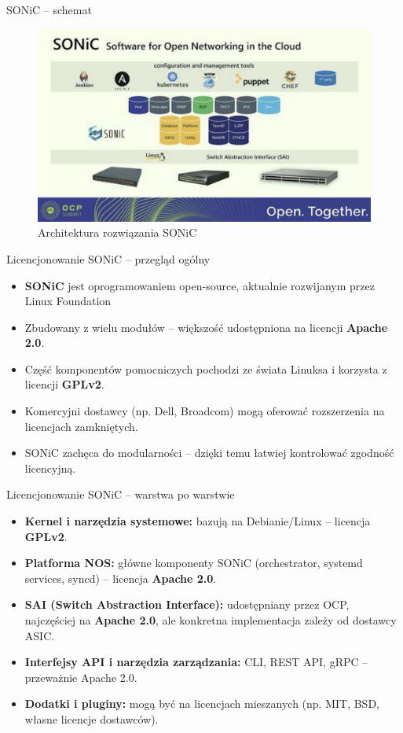 \documentclass[aspectratio=169]{beamer}
\begin{document}
\begin{frame}{SONiC -- schemat}
  \begin{figure}
      \centering
      \includegraphics[width=0.7\linewidth]{SONIC.png}
      \caption{Architektura rozwiązania SONiC}
      \label{fig:enter-label}
  \end{figure}
\end{frame}

\begin{frame}{Licencjonowanie SONiC – przegląd ogólny}
\begin{itemize}
    \item \textbf{SONiC} jest oprogramowaniem open-source, aktualnie rozwijanym przez Linux Foundation 
    \item Zbudowany z wielu modułów – większość udostępniona na licencji \textbf{Apache 2.0}.
    \item Część komponentów pomocniczych pochodzi ze świata Linuksa i korzysta z licencji \textbf{GPLv2}.
    \item Komercyjni dostawcy (np. Dell, Broadcom) mogą oferować rozszerzenia na licencjach zamkniętych.
    \item SONiC zachęca do modularności – dzięki temu łatwiej kontrolować zgodność licencyjną.
\end{itemize}
\end{frame}

\begin{frame}{Licencjonowanie SONiC – warstwa po warstwie}
\begin{itemize}
    \item \textbf{Kernel i narzędzia systemowe:} bazują na Debianie/Linux – licencja \textbf{GPLv2}.
    \item \textbf{Platforma NOS:} główne komponenty SONiC (orchestrator, systemd services, syncd) – licencja \textbf{Apache 2.0}.
    \item \textbf{SAI (Switch Abstraction Interface):} udostępniany przez OCP, najczęściej na \textbf{Apache 2.0}, ale konkretna implementacja zależy od dostawcy ASIC.
    \item \textbf{Interfejsy API i narzędzia zarządzania:} CLI, REST API, gRPC – przeważnie Apache 2.0.
    \item \textbf{Dodatki i pluginy:} mogą być na licencjach mieszanych (np. MIT, BSD, własne licencje dostawców).
\end{itemize}
\end{frame}
\end{document}
